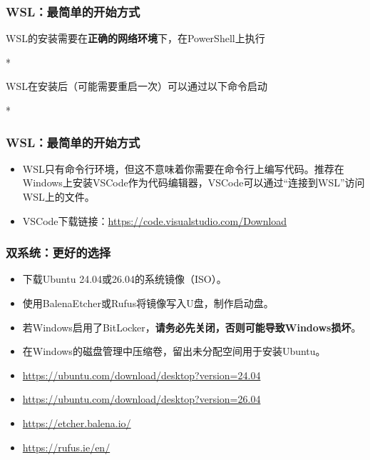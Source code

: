 \begin{frame}
    \frametitle{WSL：最简单的开始方式}
    WSL的安装需要在\textbf{正确的网络环境}下，在PowerShell上执行
    \begin{Code}*
        
    \end{Code}
    WSL在安装后（可能需要重启一次）可以通过以下命令启动
    \begin{Code}*
        
    \end{Code}
\end{frame}

\begin{frame}
    \frametitle{WSL：最简单的开始方式}
    \begin{itemize}
        \item WSL只有命令行环境，但这不意味着你需要在命令行上编写代码。推荐在Windows上安装VSCode作为代码编辑器，VSCode可以通过“连接到WSL”访问WSL上的文件。
        \item VSCode下载链接：\url{https://code.visualstudio.com/Download}
    \end{itemize}
\end{frame}

\begin{frame}
    \frametitle{双系统：更好的选择}
    \begin{itemize}
        \item 下载Ubuntu 24.04或26.04的系统镜像（ISO）。
        \item 使用BalenaEtcher或Rufus将镜像写入U盘，制作启动盘。
        \item 若Windows启用了BitLocker，\textbf{请务必先关闭，否则可能导致Windows损坏}。
        \item 在Windows的磁盘管理中压缩卷，留出未分配空间用于安装Ubuntu。
        \item \url{https://ubuntu.com/download/desktop?version=24.04}
        \item \url{https://ubuntu.com/download/desktop?version=26.04}
        \item \url{https://etcher.balena.io/}
        \item \url{https://rufus.ie/en/}
    \end{itemize}
\end{frame}


